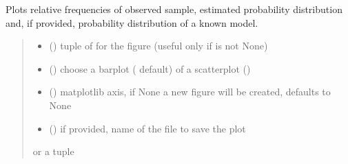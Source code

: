 \documentclass[letterpaper,10pt,english]{sphinxmanual}
\begin{document}
\begin{fulllineitems}
\begin{fulllineitems}
\end{fulllineitems}


\begin{fulllineitems}
\label{\detokenize{cubmods:cubmods.cubsh.CUBresCUBSH.plot_ordinal}}
\pysigstartsignatures
{}
\pysigstopsignatures
\sphinxAtStartPar
Plots relative frequencies of observed sample, estimated probability distribution and,
if provided, probability distribution of a known model.
\begin{quote}\begin{description}
\begin{itemize}
\item {} 
\sphinxAtStartPar
{} () \textendash{} tuple of  for the figure (useful only if  is not None)

\item {} 
\sphinxAtStartPar
{} () \textendash{} choose a barplot ( default) of a scatterplot ()

\item {} 
\sphinxAtStartPar
{} (\sphinxstyleliteralemphasis{\sphinxupquote{, }}) \textendash{} matplotlib axis, if None a new figure will be created, defaults to None

\item {} 
\sphinxAtStartPar
{} () \textendash{} if provided, name of the file to save the plot

\end{itemize}

\sphinxAtStartPar
{} or a tuple 

\end{description}\end{quote}

\end{fulllineitems}


\end{fulllineitems}
\end{document}
